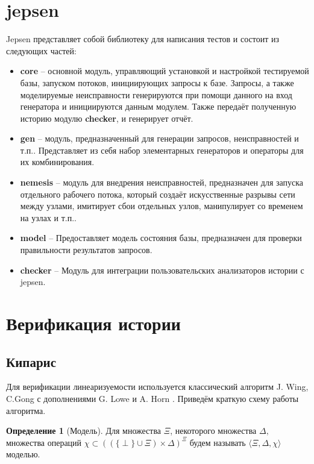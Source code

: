 \documentclass[pdftex,ptm,14pt,a4paper]{extreport}
\theoremstyle{definition}
\newtheorem{definition}{Определение}[chapter]
\begin{document}
\section{jepsen}
Jepsen представляет собой библиотеку для написания тестов и состоит из следующих частей:
\begin{itemize}
    \item \textbf{core} -- основной модуль, управляющий установкой и настройкой тестируемой базы,
        запуском потоков, инициирующих запросы к базе. Запросы, а также моделируемые неисправности
        генерируются при помощи данного на вход  генератора и инициируются данным модулем.
        Также передаёт полученную историю модулю \textbf{checker}, и генерирует отчёт.
    \item \textbf{gen} -- модуль, предназначенный для генерации запросов, неисправностей и т.п..
        Представляет из себя набор элементарных генераторов и операторы для их комбинирования.
    \item \textbf{nemesis} -- модуль для внедрения неисправностей, предназначен для запуска
        отдельного рабочего потока, который создаёт искусственные разрывы сети между узлами,
        имитирует сбои отдельных узлов, манипулирует со временем на узлах и т.п..
    \item \textbf{model} -- Предоставляет модель состояния базы, предназначен для проверки правильности результатов запросов.
    \item \textbf{checker} -- Модуль для интеграции пользовательских анализаторов истории с jepsen.
\end{itemize}

\section{Верификация истории}
\subsection{Кипарис}
\label{cypress-verify}
Для верификации линеаризуемости используется классический алгоритм J. Wing, C.Gong \cite{wing-testing}
с дополнениями G. Lowe \cite{lowe-testing} и A. Horn \cite{horn-faster}.
Приведём краткую схему работы алгоритма.
\begin{definition}[Модель]
    Для множества $\Xi$, некоторого множества $\Delta,$ множества операций $\chi \subset ((\{\perp \} \cup
    \Xi) \times \Delta)^\Xi$
    будем называть $\langle \Xi, \Delta, \chi \rangle$ моделью.
\end{definition}
\end{document}
